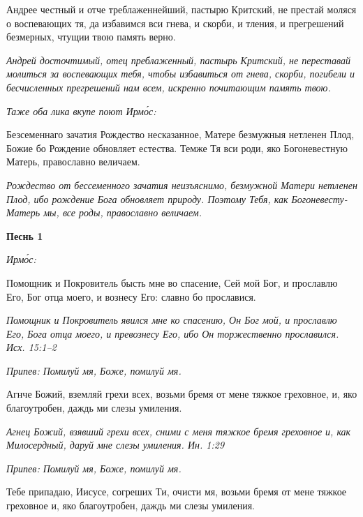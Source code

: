 Андрее честный и отче треблаженнейший, пастырю Критский, не престай моляся о воспевающих тя, да избавимся вси гнева, и скорби, и тления, и прегрешений безмерных, чтущии твою память верно.


\itshape Андрей досточтимый, отец преблаженный, пастырь Критский, не переставай молиться за воспевающих тебя, чтобы избавиться от гнева, скорби, погибели и бесчисленных прегрешений нам всем, искренно почитающим память твою.\normalfont{}


\itshape Таже оба лика вкупе поют Ирмо́с:\normalfont{}


Безсеменнаго зачатия Рождество несказанное, Матере безмужныя нетленен Плод, Божие бо Рождение обновляет естества. Темже Тя вси роди, яко Богоневестную Матерь, православно величаем.


\itshape Рождество от бессеменного зачатия неизъяснимо, безмужной Матери нетленен Плод, ибо рождение Бога обновляет природу. Поэтому Тебя, как Богоневесту-Матерь мы, все роды, православно величаем.\normalfont{}




\mychapterending

 






\bfseries Песнь 1\normalfont{}


\itshape Ирмо́с:\normalfont{}


Помощник и Покровитель бысть мне во спасение, Сей мой Бог, и прославлю Его, Бог отца моего, и вознесу Его: славно бо прославися.


\itshape Помощник и Покровитель явился мне ко спасению, Он Бог мой, и прославлю Его, Бога отца моего, и превознесу Его, ибо Он торжественно прославился. Исх. 15:1–2\normalfont{}


\itshape Припев:\normalfont{} Помилуй мя, Боже, помилуй мя.


Агнче Божий, вземляй грехи всех, возьми бремя от мене тяжкое греховное, и, яко благоутробен, даждь ми слезы умиления.


\itshape Агнец Божий, взявший грехи всех, сними с меня тяжкое бремя греховное и, как Милосердный, даруй мне слезы умиления. Ин. 1:29\normalfont{}


\itshape Припев:\normalfont{} Помилуй мя, Боже, помилуй мя.


Тебе припадаю, Иисусе, согреших Ти, очисти мя, возьми бремя от мене тяжкое греховное и, яко благоутробен, даждь ми слезы умиления.


